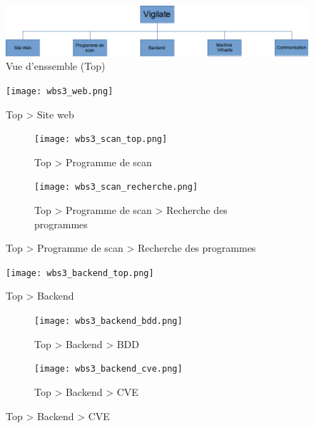\begin{figure}[H]
  \vspace*{2cm}
  \caption{Vue d'enssemble (Top)}
  \centering
  \vspace*{0.5cm}
  \includegraphics[max width=18cm]{wbs3_top.png}
\end{figure}

\begin{figure}[H]
  \vspace*{2cm}
  \caption{Top \textgreater{} Site web}
  \centering
  \vspace*{0.5cm}
  \texttt{[image: wbs3\_web.png]}
\end{figure}


\begin{figure}[h]

  \begin{subfigure}{0.5\textwidth}
    \centering
    \caption{Top \textgreater{} Programme de scan}
    \texttt{[image: wbs3\_scan\_top.png]}
  \end{subfigure}
  \begin{subfigure}{0.5\textwidth}
    \centering
    \caption{Top \textgreater{} Programme de scan \textgreater{} Recherche des programmes}
    \texttt{[image: wbs3\_scan\_recherche.png]}
  \end{subfigure}

  \label{fig:image2}
\end{figure}


\begin{figure}[H]
  \vspace*{2cm}
  \caption{Top \textgreater{} Backend}
  \centering
  \vspace*{0.5cm}
  \texttt{[image: wbs3\_backend\_top.png]}
\end{figure}

\vspace*{1cm}

\begin{figure}[h]

  \begin{subfigure}{0.5\textwidth}
    \centering
    \caption{Top \textgreater{} Backend \textgreater{} BDD}
    \texttt{[image: wbs3\_backend\_bdd.png]}
  \end{subfigure}
  \begin{subfigure}{0.5\textwidth}
    \centering
    \caption{Top \textgreater{} Backend \textgreater{} CVE}
    \texttt{[image: wbs3\_backend\_cve.png]}
  \end{subfigure}

  \label{fig:image2}
\end{figure}


